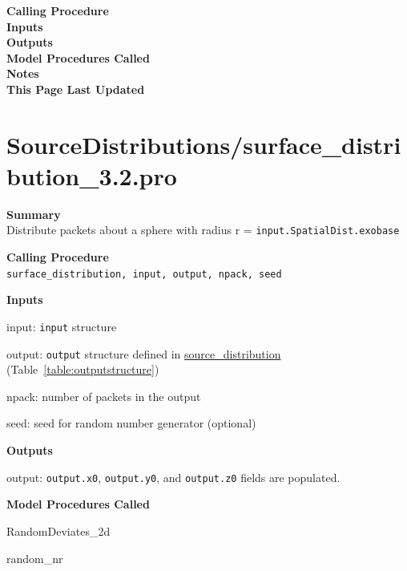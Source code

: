 \documentclass[11pt]{article}
\newcommand\descrip[1]{\textsf{\textbf{\large{#1}}}\\}
\begin{document}
\descrip{Calling Procedure}

\descrip{Inputs}

\descrip{Outputs}

\descrip{Model Procedures Called}

\descrip{Notes}

\descrip{This Page Last Updated}

\clearpage

\section{SourceDistributions/surface\_distribution\_3.2.pro}
\label{sec:surface_distribution}

\descrip{Summary}
Distribute packets about a sphere with radius r = 
  \texttt{input.SpatialDist.exobase}

\descrip{Calling Procedure}
\verb+surface_distribution, input, output, npack, seed+

\descrip{Inputs}
\begin{compactenum} \listup
\item input: \texttt{input} structure
\item output: \texttt{output} structure defined in
\hyperref[sec:source_distribution]{source\_distribution}
(Table~\ref{table:outputstructure})
\item npack: number of packets in the output
\item seed: seed for random number generator (optional)
\end{compactenum}

\descrip{Outputs}
\begin{compactenum} \listup
\item output: \texttt{output.x0}, \texttt{output.y0}, and \texttt{output.z0}
fields are populated.
\end{compactenum}

\descrip{Model Procedures Called}
\begin{compactenum} \listup
\item RandomDeviates\_2d
\item random\_nr
\end{compactenum}
\end{document}
